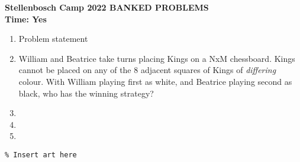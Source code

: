 \documentclass{article}
\begin{document}
\thispagestyle{empty}

\begin{center}
  \textbf{\large Stellenbosch Camp 2022 BANKED PROBLEMS}
  \\ \vspace{1em}
  \textbf{\large Time: Yes}
\end{center}

\bigskip

\begin{enumerate}[itemsep=\fill]

\item %
Problem statement

\item %

William and Beatrice take turns placing Kings on a NxM chessboard. Kings cannot be placed on any of the 8 adjacent squares of Kings of \emph{differing} colour. With William playing first as white, and Beatrice playing second as black, who has the winning strategy?

\item %


\item %


\item %

\end{enumerate}


\centering
\small
\begin{BVerbatim}
\end{BVerbatim}
\end{document}
